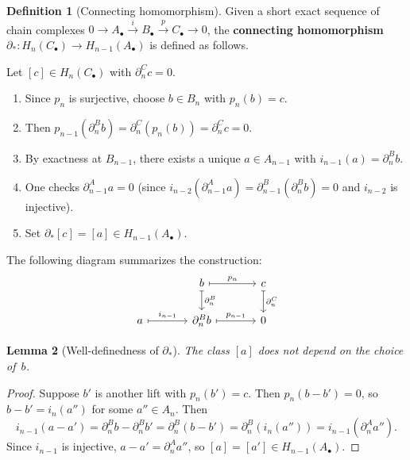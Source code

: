 \documentclass[12pt,a4paper,openany]{book}
\theoremstyle{definition}
\newtheorem{definition}{Definition}[chapter]
\theoremstyle{plain}
\newtheorem{lemma}[definition]{Lemma}
\theoremstyle{remark}
\begin{document}
\begin{definition}[Connecting homomorphism]\label{def:connecting-hom}
Given a short exact sequence of chain complexes
$0\to A_\bullet\xrightarrow{i} B_\bullet\xrightarrow{p} C_\bullet\to 0$,
the \textbf{connecting homomorphism}
$\partial_*\colon H_n(C_\bullet)\to H_{n-1}(A_\bullet)$
is defined as follows.

Let $[c]\in H_n(C_\bullet)$ with $\partial^C_n c=0$.
\begin{enumerate}[label=\textup{Step \arabic*.},leftmargin=3.5em]
  \item Since $p_n$ is surjective, choose $b\in B_n$ with $p_n(b)=c$.
  \item Then $p_{n-1}(\partial^B_n b)=\partial^C_n(p_n(b))=\partial^C_n c=0$.
  \item By exactness at $B_{n-1}$, there exists a unique $a\in A_{n-1}$
    with $i_{n-1}(a)=\partial^B_n b$.
  \item One checks $\partial^A_{n-1}a=0$ (since $i_{n-2}(\partial^A_{n-1}a)=\partial^B_{n-1}(\partial^B_n b)=0$ and $i_{n-2}$ is injective).
  \item Set $\partial_*[c]=[a]\in H_{n-1}(A_\bullet)$.
\end{enumerate}

The following diagram summarizes the construction:
\[
\begin{tikzcd}[column sep=large]
  & b \ar[d,mapsto,"\partial^B_n"] \ar[r,mapsto,"p_n"] & c \ar[d,mapsto,"\partial^C_n"] \\
  a \ar[r,mapsto,"i_{n-1}"] & \partial^B_n b \ar[r,mapsto,"p_{n-1}"] & 0
\end{tikzcd}
\]
\end{definition}

\begin{lemma}[Well-definedness of $\partial_*$]\label{lem:connecting-well-defined}
The class $[a]$ does not depend on the choice of~$b$.
\end{lemma}

\begin{proof}
Suppose $b'$ is another lift with $p_n(b')=c$.  Then $p_n(b-b')=0$, so
$b-b'=i_n(a'')$ for some $a''\in A_n$.  Then
\[
  i_{n-1}(a-a')
  = \partial^B_n b - \partial^B_n b'
  = \partial^B_n(b-b')
  = \partial^B_n(i_n(a''))
  = i_{n-1}(\partial^A_n a'').
\]
Since $i_{n-1}$ is injective, $a-a'=\partial^A_n a''$, so
$[a]=[a']\in H_{n-1}(A_\bullet)$.
\end{proof}
\end{document}
